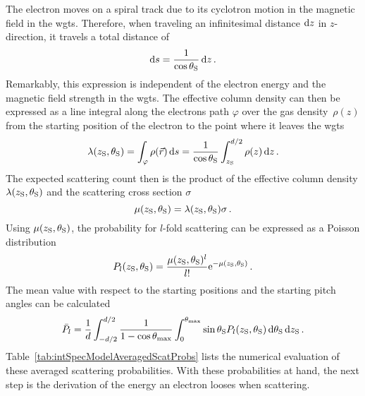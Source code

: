 The electron moves on a spiral track due to its cyclotron motion in the magnetic field in the \gls{wgts}. Therefore, when traveling an infinitesimal distance $\mathop{}\!\mathrm{d} z$ in $z$-direction, it travels a total distance of
\begin{equation}
\label{eq:intSpecModelInfinitesimalElecPath}
\mathop{}\!\mathrm{d} s = \frac{1}{\cos\theta_\mathrm{S}} \mathop{}\!\mathrm{d} z 
\text{\,.}
\end{equation}
Remarkably, this expression is independent of the electron energy and the magnetic field strength in the \gls{wgts}. The effective column density can then be expressed as a line integral along the electrons path $\varphi$ over the gas density~$\rho(z)$ from the starting position of the electron to the point where it leaves the \gls{wgts}
\begin{equation}
\label{eq:intSpecModelEffColumnDensity}
\lambda(z_\mathrm{S},\theta_\mathrm{S}) = 
\int_{\varphi} \rho(\Vec{r})\mathop{}\!\mathrm{d} s =
\frac{1}{\cos\theta_\mathrm{S}}
\int_{z_\mathrm{S}}^{d/2} \rho(z)\mathop{}\!\mathrm{d} z
\text{\,.}
\end{equation}
The expected scattering count then is the product of the effective column density $\lambda(z_\mathrm{S},\theta_\mathrm{S})$ and the scattering cross section $\sigma$~\cite{Groh2015}
\begin{equation}
\label{eq:intSpecModelExpectedScatteringCount}
\mu(z_\mathrm{S}, \theta_\mathrm{S}) = \lambda(z_\mathrm{S},\theta_\mathrm{S}) \sigma \text{\,.}
\end{equation}
Using $\mu(z_\mathrm{S}, \theta_\mathrm{S})$, the probability for $l$-fold scattering can be expressed as a Poisson distribution~\cite{Groh2015}
\begin{equation}
\label{eq:intSpecModelNonAveragedScatProbs}
P_l(z_\mathrm{S}, \theta_\mathrm{S}) = 
\frac{
	\mu(z_\mathrm{S}, \theta_\mathrm{S})^l
}{l!}
\mathrm{e}^{-\mu(z_\mathrm{S}, \theta_\mathrm{S})} \text{\,.}
\end{equation}
The mean value with respect to the starting positions and the starting pitch angles can be calculated~\cite{Groh2015}
\begin{equation}
	\label{eq:intSpecModelAveragedScatProbs}
	\bar{P}_l =
	\frac{1}{d}
	\int_{-d/2}^{d/2}
		\frac{1}{1-\cos\theta_\mathrm{max}}
		\int_{0}^{\theta_\mathrm{max}}
			\sin\theta_\mathrm{S}
			P_l(z_\mathrm{S},\theta_\mathrm{S})
		\mathop{}\!\mathrm{d} \theta_\mathrm{S}
	\mathop{}\!\mathrm{d} z_\mathrm{S}
	\text{\,.}
\end{equation}
Table~\ref{tab:intSpecModelAveragedScatProbs} lists the numerical evaluation of these averaged scattering probabilities. With these probabilities at hand, the next step is the derivation of the energy an electron looses when scattering.

